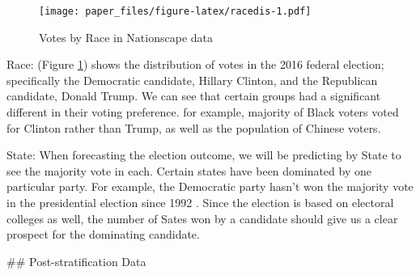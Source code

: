 \documentclass[
]{article}
\begin{document}
\begin{figure}
\centering
\texttt{[image: paper\_files/figure-latex/racedis-1.pdf]}
\caption{\label{fig:racedis}Votes by Race in Nationscape data}
\end{figure}

Race: (Figure \ref{fig:racedis}) shows the distribution of votes in the 2016 federal election; specifically the Democratic candidate, Hillary Clinton, and the Republican candidate, Donald Trump. We can see that certain groups had a significant different in their voting preference. for example, majority of Black voters voted for Clinton rather than Trump, as well as the population of Chinese voters.

State: When forecasting the election outcome, we will be predicting by State to see the majority vote in each. Certain states have been dominated by one particular party. For example, the Democratic party hasn't won the majority vote in the presidential election since 1992 \citep{cite270towin}. Since the election is based on electoral colleges as well, the number of Sates won by a candidate should give us a clear prospect for the dominating candidate.

\#\# Post-stratification Data
\end{document}
